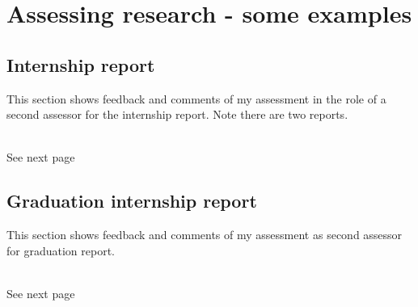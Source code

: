 \chapter{Assessing research - some examples}\label{appendices:research_assessing}
\section{Internship report}
\label{appendices:internship_report_appendix}
This section shows feedback and comments of my assessment in the role of a second assessor for the internship report. Note there are two reports.\\\\
\begin{minipage}{0.5\textwidth}
\begin{flushleft}
\end{flushleft}
\end{minipage}
\hfill
\begin{minipage}{0.5\textwidth}
\begin{flushright}
   See next page
\end{flushright}
\end{minipage}



\section{Graduation internship report}
\label{appendices:research_assessing_graduation}
This section shows feedback and comments of my assessment as second assessor for graduation report.\\\\
\begin{minipage}{0.5\textwidth}
\begin{flushleft}
\end{flushleft}
\end{minipage}
\hfill
\begin{minipage}{0.5\textwidth}
\begin{flushright}
   See next page
\end{flushright}
\end{minipage}



